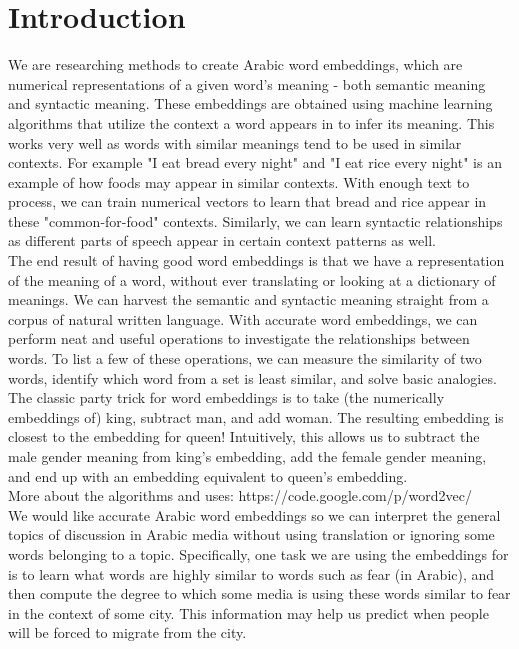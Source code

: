 \section{Introduction}

We are researching methods to create Arabic word embeddings, which are numerical representations of a given word’s meaning - both semantic meaning and syntactic meaning.
These embeddings are obtained using machine learning algorithms that utilize the context a word appears in to infer its meaning.
This works very well as words with similar meanings tend to be used in similar contexts.
For example "I eat bread every night" and "I eat rice every night" is an example of how foods may appear in similar contexts.
With enough text to process, we can train numerical vectors to learn that bread and rice appear in these "common-for-food" contexts.
Similarly, we can learn syntactic relationships as different parts of speech appear in certain context patterns as well.
\\
The end result of having good word embeddings is that we have a representation of the meaning of a word, without ever translating or looking at a dictionary of meanings. 
We can harvest the semantic and syntactic meaning straight from a corpus of natural written language. 
With accurate word embeddings, we can perform neat and useful operations to investigate the relationships between words.
To list a few of these operations, we can measure the similarity of two words, identify which word from a set is least similar, and solve basic analogies.
The classic party trick for word embeddings is to take (the numerically embeddings of) king, subtract man, and add woman.
The resulting embedding is closest to the embedding for queen!
Intuitively, this allows us to subtract the male gender meaning from king’s embedding, add the female gender meaning, and end up with an embedding equivalent to queen’s embedding.
\\
More about the algorithms and uses: https://code.google.com/p/word2vec/
\\
We would like accurate Arabic word embeddings so we can interpret the general topics of discussion in Arabic media without using translation or ignoring some words belonging to a topic.
Specifically, one task we are using the embeddings for is to learn what words are highly similar to words such as fear (in Arabic), and then compute the degree to which some media is using these words similar to fear in the context of some city.
This information may help us predict when people will be forced to migrate from the city.